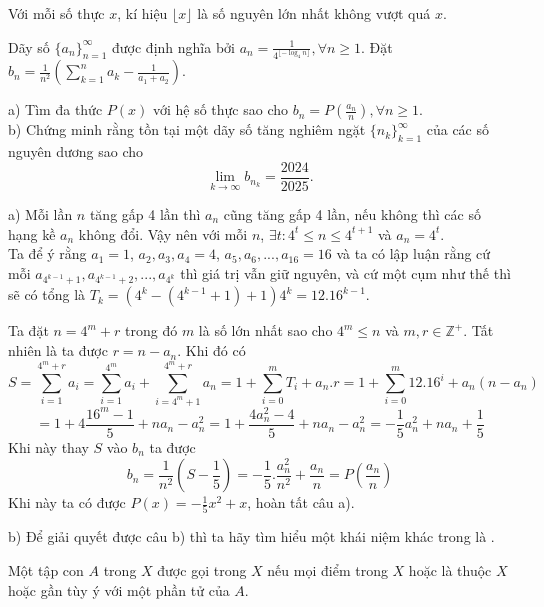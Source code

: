 \documentclass[11pt]{scrartcl}
\begin{document}
\begin{itemize}[label=, leftmargin=0em, itemsep=0.5em]
    \begin{bt}
        Với mỗi số thực $x$, kí hiệu $\lfloor x \rfloor$ là số nguyên lớn nhất không vượt quá $x$.


Dãy số $\{a_n \}_{n=1}^{\infty}$ được định nghĩa bởi $a_n = \frac{1}{4^{\lfloor -\log_4 n \rfloor}}, \forall n \geq 1.$ Đặt $b_n = \frac{1}{n^2} \left( \sum_{k=1}^n a_k - \frac{1}{a_1+a_2} \right).$

a) Tìm đa thức $P(x)$ với hệ số thực sao cho $b_n = P \left( \frac{a_n}{n} \right), \forall n \geq 1$.\\
b) Chứng minh rằng tồn tại một dãy số tăng nghiêm ngặt $\{n_k \}_{k=1}^{\infty}$ của các số nguyên dương sao cho$$\lim_{k \to \infty} b_{n_k} = \frac{2024}{2025}.$$
    \end{bt}

    \begin{sol}
        a) Mỗi lần $n$ tăng gấp 4 lần thì $a_n$ cũng tăng gấp 4 lần, nếu không thì các số hạng kề $a_n$ không đổi. Vậy nên với mỗi $n$, $\exists t: 4^t \leq n \leq 4^{t + 1}$ và $a_n = 4^t$.\\
        Ta để ý rằng $a_1 = 1$, $a_2,a_3,a_4 = 4$, $a_5,a_6,...,a_{16} = 16$ và ta có lập luận rằng cứ mỗi $a_{4^{k-1} + 1},a_{4^{k-1} + 2},...,a_{4^k}$ thì giá trị vẫn giữ nguyên, và cứ một cụm như thế thì sẽ có tổng là $T_k = (4^{k} - (4^{k-1} + 1) + 1)4^k = 12.16^{k-1}$.


        Ta đặt $n = 4^m + r$ trong đó $m$ là số lớn nhất sao cho $4^m \leq n$ và $m,r \in \mathbb{Z}^+$. Tất nhiên là ta được $r = n - a_n$. Khi đó có 
        \[S = \sum_{i = 1}^{4^m + r} a_i = \sum_{i = 1}^{4^m}a_i + \sum_{i = 4^m + 1}^{4^m + r} a_n = 1 + \sum_{i = 0}^{m} T_i + a_n.r = 1 + \sum_{i = 0}^{m} 12.16^{i} + a_n(n - a_n)\]\[ = 1 + 4\frac{16^m - 1}{5}  + na_n - a_n^2 = 1 + \frac{4a_n^2 - 4}{5} +na_n -a_n^2 = -\frac{1}{5}a_n^2 + na_n + \frac{1}{5}\]
        Khi này thay $S$ vào $b_n$ ta được 
        \[b_n = \frac{1}{n^2}\left(S - \frac{1}{5}\right) = -\frac{1}{5}.\frac{a_n^2}{n^2} + \frac{a_n}{n} = P\left(\frac{a_n}{n}\right)\]
        Khi này ta có được $P(x) = -\frac{1}{5}x^2 + x$, hoàn tất câu a).


        b) Để giải quyết được câu b) thì ta hãy tìm hiểu một khái niệm khác trong  là .

        
         Một tập con $A$ trong $X$ được gọi  trong $X$ nếu mọi điểm trong $X$ hoặc là thuộc $X$ hoặc gần tùy ý với một phần tử của $A$.



\end{sol}
\end{itemize}
\end{document}
